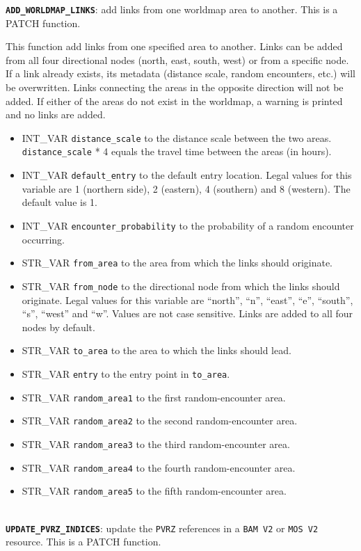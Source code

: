 \documentclass{article}
\def\DEFINE#1{{\tt \bf #1}\label{#1}\index{#1}}
\def\t#1{{\tt #1}}
\begin{document}
\DEFINE{\verb+ADD_WORLDMAP_LINKS+}: add links from one worldmap area to another. This is a PATCH function.

This function add links from one specified area to another. Links can be added from all four directional nodes (north, east, south, west) or from a specific node. If a link already exists, its metadata (distance scale, random encounters, etc.) will be overwritten. Links connecting the areas in the opposite direction will not be added. If either of the areas do not exist in the worldmap, a warning is printed and no links are added.

\begin{itemize}
\item INT_VAR \verb+distance_scale+ to the distance scale between the two areas. \verb+distance_scale+ * 4 equals the travel time between the areas (in hours).
\item INT_VAR \verb+default_entry+ to the default entry location. Legal values for this variable are 1 (northern side), 2 (eastern), 4 (southern) and 8 (western). The default value is 1.
\item INT_VAR \verb+encounter_probability+ to the probability of a random encounter occurring.
\item STR_VAR \verb+from_area+ to the area from which the links should originate.
\item STR_VAR \verb+from_node+ to the directional node from which the links should originate. Legal values for this variable are ``north'', ``n'', ``east'', ``e'', ``south'', ``s'', ``west'' and ``w''. Values are not case sensitive. Links are added to all four nodes by default.
\item STR_VAR \verb+to_area+ to the area to which the links should lead.
\item STR_VAR \verb+entry+ to the entry point in \verb+to_area+.
\item STR_VAR \verb+random_area1+ to the first random-encounter area.
\item STR_VAR \verb+random_area2+ to the second random-encounter area.
\item STR_VAR \verb+random_area3+ to the third random-encounter area.
\item STR_VAR \verb+random_area4+ to the fourth random-encounter area.
\item STR_VAR \verb+random_area5+ to the fifth random-encounter area.
\end{itemize}
\\

\DEFINE{\verb+UPDATE_PVRZ_INDICES+}: update the \t{PVRZ} references in a \t{BAM V2} or \t{MOS V2} resource. This is a PATCH function.
\end{document}
